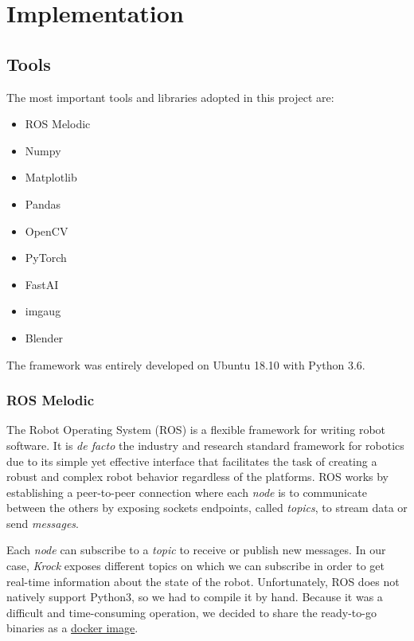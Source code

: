 \documentclass[../document.tex]{subfiles}
\begin{document}
\section{Implementation}

\subsection{Tools}
The most important tools and libraries adopted in this project are:

\begin{itemize}
    \item ROS Melodic
    \item Numpy
    \item Matplotlib
    \item Pandas
    \item OpenCV
    \item PyTorch
    \item FastAI
    \item imgaug
    \item Blender
\end{itemize}
The framework was entirely developed on Ubuntu 18.10 with Python 3.6.

\subsubsection{ROS Melodic}
The Robot Operating System (ROS) \cite{ROS} is a flexible framework for writing robot software. It is \emph{de facto} the industry and research standard framework for robotics due to its simple yet effective interface that facilitates the task of creating a robust and complex robot behavior regardless of the platforms. ROS works by establishing a peer-to-peer connection where each \emph{node} is to communicate between the others by exposing sockets endpoints, called \emph{topics}, to stream data or send \emph{messages}. 

Each \emph{node} can subscribe to a \emph{topic} to receive or publish new messages. In our case, \emph{Krock} exposes different topics on which we can subscribe in order to get real-time information about the state of the robot.
Unfortunately, ROS does not natively support Python3, so we had to compile it by hand. Because it was a difficult and time-consuming operation, we decided to share the ready-to-go binaries as a \href{https://hub.docker.com/r/zuppif/ros-melodic-python3/}{docker image}. 
\end{document}
